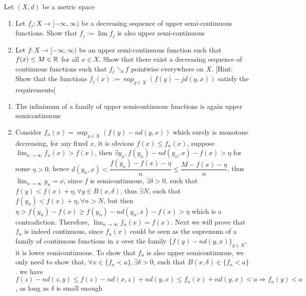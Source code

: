 \documentclass[../main.tex]{subfiles}
\begin{document}
\begin{problem}
Let $(X,d)$ be a metric space
\begin{enumerate}
\item Let $f_j: X \to [-\infty,\infty)$ be a decreasing sequence of upper semi-continuous functions. Show that $f_j:= \lim f_j$ is also upper semi-continuous
\item Let $f: X \to [-\infty,\infty)$ be an upper semi-continuous function such that $f(x) \leq M \in \Bbb R$ for all $x \in X$. Show that there exist a decreasing sequence of continuous functions such that $f_j \searrow f$ pointwise everywhere on $X$. [Hint: Show that the functions $f_j(x):= \sup_{y \in X} (f(y) - j d(y,x))$ satisfy the requirements]
\end{enumerate}
\end{problem}

\begin{solution} \hfill
\begin{enumerate}
\item The infinimum of a family of upper semicontinuous functions is again upper semicontinuous
\item Consider $ f_{n}(x) = \sup_{y\in X}\left( f(y) - nd(y,x) \right) $ which surely is monotone decreasing, for any fixed $x$, it is obvious \(f(x)\leq f_{n}(x)\), suppose $\lim_{n\rightarrow \infty}f_{n}(x)>f(x)$, then \(\exists y_{n}, f(y_{n})-nd(y_{n},x)-f(x)>\eta \) for some \(\eta>0\), hence \(d(y_{n},x)<\dfrac{f(y_{n})-f(x)-\eta}{n}\leq\dfrac{M-f(x)-\eta}{n}\), thus \(\lim_{n\rightarrow \infty}y_{n}=x\), since \(f\) is semicontinuous, \(\exists\delta>0\), such that\(f(y)<f(x)+\eta, \forall y\in B(x,\delta)\), thus \(\exists N\), such that \(f(y_{n})<f(x)+\eta, \forall n>N\), but then \(\eta>f(y_{n})-f(x)\geq f(y_{n})-nd(y_{n},x)-f(x)>\eta\) which is a contradiction. Therefore, $\lim_{n\rightarrow \infty}f_{n}(x)=f(x)$. Next we will prove that \(f_{n}\) is indeed continuous, since $ f_{n}(x) $ could be seen as the supremum of a family of continuous functions in $x$ over the family \(\{f(y) - nd(y,x)\}_{y\in X}\), it is lower semicontinuous. To show that \(f_{n}\) is also upper semicontinuous, we only need to show that, \(\forall x\in\{f_{n}<a\}, \exists\delta>0\), such that \(B(x,\delta)\in\{f_{n}<a\}\). we have \(f(z)-nd(z,y)\leq f(z)-nd(x,z)+nd(y,x)\leq f_{n}(x)+nd(y,x)<a\Rightarrow f_{n}(y)<a\), as long as $\delta$ is small enough
\end{enumerate}
\end{solution}
\end{document}
